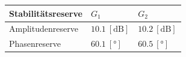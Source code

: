 \begin{table}[h!]
    \centering
    \begin{tabular}{l|ll}
        Stabilitätsreserve  & $G_1$                     & $G_2$ \\
        \hline
        Amplitudenreserve   & $10.1~[\si{\deci\bel}]$   & $10.2~[\si{\deci\bel}]$ \\
        Phasenreserve       & $60.1~[\si{\degree}]$     & $60.5~[\si{\degree}]$ \\
    \end{tabular}
\end{table}

